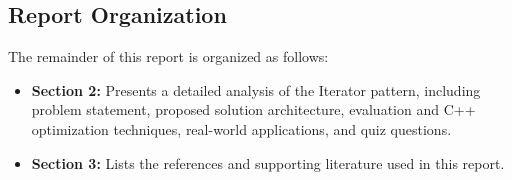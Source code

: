 \subsection{Report Organization}
The remainder of this report is organized as follows:
\begin{itemize}
    \item \textbf{Section 2:} Presents a detailed analysis of the Iterator pattern, including problem statement, proposed solution architecture, evaluation and C++ optimization techniques, real-world applications, and quiz questions.
    \item \textbf{Section 3:} Lists the references and supporting literature used in this report.
\end{itemize}
